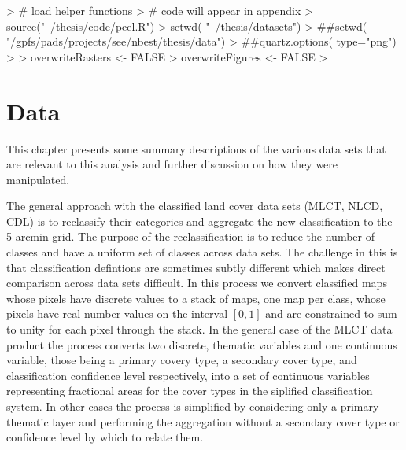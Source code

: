 







\graphicspath{ {datasets/} }

\begin{Schunk}
\begin{Sinput}
>                                         # load helper functions
>                                         # code will appear in appendix
> source("~/thesis/code/peel.R")
> setwd( "~/thesis/datasets")
> ##setwd( "/gpfs/pads/projects/see/nbest/thesis/data")
> ##quartz.options( type="png")
> 
> overwriteRasters <- FALSE
> overwriteFigures <- FALSE
> 
\end{Sinput}
\end{Schunk}

\chapter{Data}
\label{cha:data}

This chapter presents some summary descriptions of the various data
sets that are relevant to this analysis and further discussion on how
they were manipulated.

The general approach with the classified land cover data sets (MLCT,
NLCD, CDL) is to reclassify their categories and aggregate the new
classification to the 5-arcmin grid.  The purpose of the
reclassification is to reduce the number of classes and have a uniform
set of classes across data sets.  The challenge in this is that
classification defintions are sometimes subtly different which makes
direct comparison across data sets difficult.  In this process we
convert classified maps whose pixels have discrete values to a stack
of maps, one map per class, whose pixels have real number values on
the interval $[0,1]$ and are constrained to sum to unity for each
pixel through the stack.  In the general case of the MLCT data product
the process converts two discrete, thematic variables and one
continuous variable, those being a primary covery type, a secondary
cover type, and classification confidence level respectively, into a
set of continuous variables representing fractional areas for the
cover types in the siplified classification system.  In other cases
the process is simplified by considering only a primary thematic layer
and performing the aggregation without a secondary cover type or
confidence level by which to relate them.

